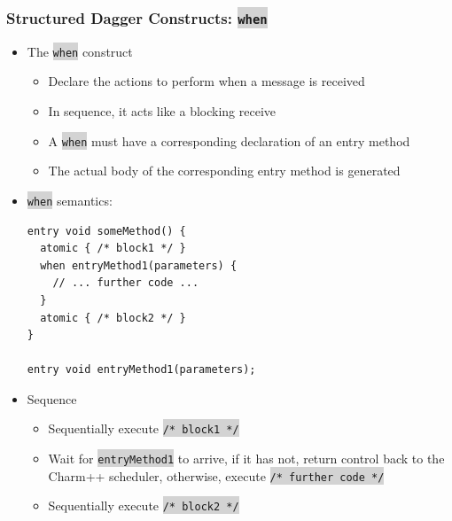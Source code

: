 \documentclass{beamer}
\newcommand{\code}[1]{\colorbox{lightgray}{\texttt{#1}}}
\begin{document}
\begin{frame}[fragile]
  \frametitle{Structured Dagger Constructs: \code{when}}
  \begin{itemize}
    \item The \code{when} construct
      \begin{itemize}
        \item Declare the actions to perform when a message is received
        \item In sequence, it acts like a blocking receive
        \item A \code{when} must have a corresponding declaration of an entry
          method
        \item The actual body of the corresponding entry method is generated
      \end{itemize}
    \item \code{when} semantics:
      \begin{lstlisting}[basicstyle=\tiny]
entry void someMethod() {
  atomic { /* block1 */ }
  when entryMethod1(parameters) {
    // ... further code ...
  }
  atomic { /* block2 */ }
}

entry void entryMethod1(parameters);
      \end{lstlisting}
    \item Sequence
      \begin{itemize}
        \item Sequentially execute \code{/* block1 */}
        \item Wait for \code{entryMethod1} to arrive, if it has not, return control
          back to the Charm++ scheduler, otherwise, execute \code{/* further code */}
        \item Sequentially execute \code{/* block2 */}
      \end{itemize}
  \end{itemize}
\end{frame}
\end{document}
